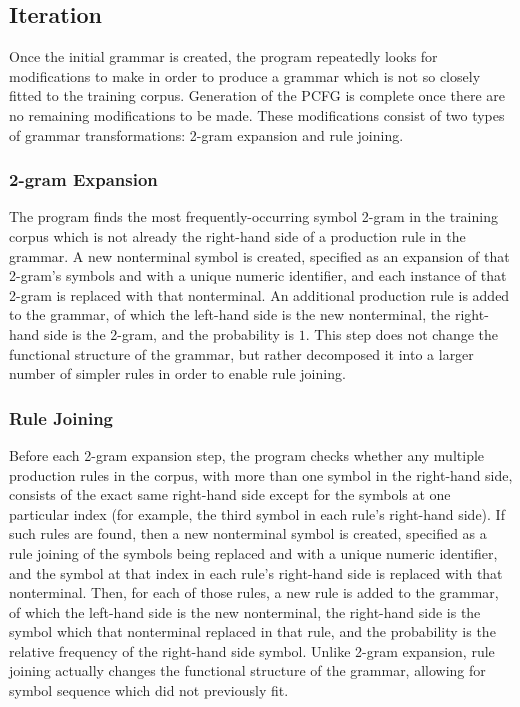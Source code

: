 \documentclass[paper=a4, fontsize=11pt]{scrartcl} %
\numberwithin{equation}{section} %
\numberwithin{figure}{section} %
\numberwithin{table}{section} %
\begin{document}
\subsection{Iteration}

Once the initial grammar is created, the program repeatedly looks for modifications to make in order to produce a grammar which is not so closely fitted to the training corpus. Generation of the PCFG is complete once there are no remaining modifications to be made. These modifications consist of two types of grammar transformations: 2-gram expansion and rule joining.

\subsubsection{2-gram Expansion}

The program finds the most frequently-occurring symbol 2-gram in the training corpus which is not already the right-hand side of a production rule in the grammar. A new nonterminal symbol is created, specified as an expansion of that 2-gram's symbols and with a unique numeric identifier, and each instance of that 2-gram is replaced with that nonterminal. An additional production rule is added to the grammar, of which the left-hand side is the new nonterminal, the right-hand side is the 2-gram, and the probability is $1$. This step does not change the functional structure of the grammar, but rather decomposed it into a larger number of simpler rules in order to enable rule joining.

\subsubsection{Rule Joining}

Before each 2-gram expansion step, the program checks whether any multiple production rules in the corpus, with more than one symbol in the right-hand side, consists of the exact same right-hand side except for the symbols at one particular index (for example, the third symbol in each rule's right-hand side). If such rules are found, then a new nonterminal symbol is created, specified as a rule joining of the symbols being replaced and with a unique numeric identifier, and the symbol at that index in each rule's right-hand side is replaced with that nonterminal. Then, for each of those rules, a new rule is added to the grammar, of which the left-hand side is the new nonterminal, the right-hand side is the symbol which that nonterminal replaced in that rule, and the probability is the relative frequency of the right-hand side symbol. Unlike 2-gram expansion, rule joining actually changes the functional structure of the grammar, allowing for symbol sequence which did not previously fit.
\end{document}
